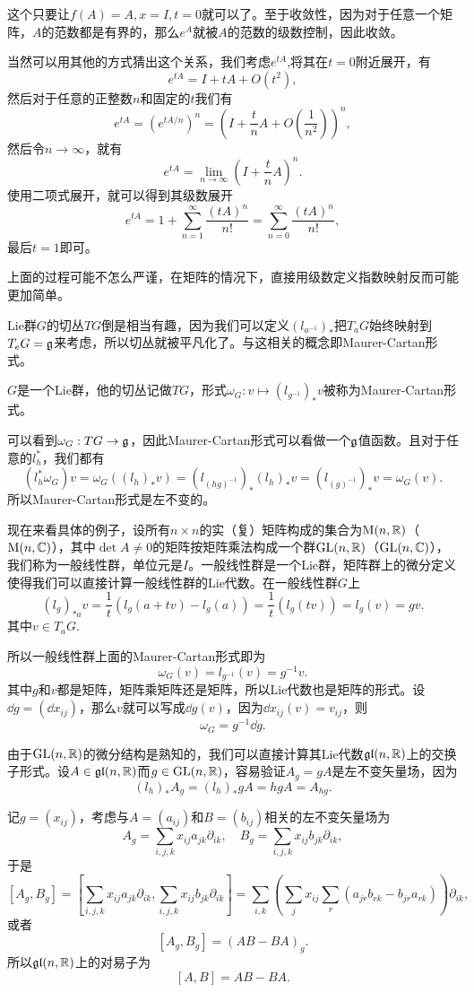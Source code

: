 这个只要让$f(A)=A,x=I,t=0$就可以了。至于收敛性，因为对于任意一个矩阵，$A$的范数都是有界的，那么$e^A$就被$A$的范数的级数控制，因此收敛。

当然可以用其他的方式猜出这个关系，我们考虑$e^{tA}$,将其在$t=0$附近展开，有
\[
e^{tA}=I+tA+O(t^2),
\]
然后对于任意的正整数$n$和固定的$t$我们有
\[
e^{tA}=\left(e^{tA/n}\right)^n=\left(I+\frac{t}{n}A+O\left(\frac{1}{n^2}\right)\right)^n,
\]
然后令$n\to\infty$，就有
\[
e^{tA}=\lim_{n\to\infty}\left(I+\frac{t}{n}A\right)^n.
\]
使用二项式展开，就可以得到其级数展开
\[
	e^{tA}=1+\sum_{n=1}^\infty \frac{(tA)^n}{n!}=\sum_{n=0}^\infty \frac{(tA)^n}{n!},
\]
最后$t=1$即可。

上面的过程可能不怎么严谨，在矩阵的情况下，直接用级数定义指数映射反而可能更加简单。

Lie群$G$的切丛$TG$倒是相当有趣，因为我们可以定义$(l_{a^{-1}})_*$把$T_aG$始终映射到$T_eG={\mathfrak{g}}$来考虑，所以切丛就被平凡化了。与这相关的概念即Maurer-Cartan形式。

\para
$G$是一个Lie群，他的切丛记做$TG$，形式$\omega_G:v\mapsto (l_{g^{-1}})_*v$被称为Maurer-Cartan形式。

可以看到$\omega_G:TG\to {\mathfrak{g}}$，因此Maurer-Cartan形式可以看做一个${\mathfrak{g}}$值函数。且对于任意的$l_h^*$，我们都有
\[
(l_h^*\omega_G)v=\omega_G((l_h)_*v)=(l_{(hg)^{-1}})_*(l_h)_*v=(l_{(g)^{-1}})_*v=\omega_G(v).
\]
所以Maurer-Cartan形式是左不变的。

现在来看具体的例子，设所有$n\times n$的实（复）矩阵构成的集合为$\mathrm{M}(n,\mathbb{R})$（$\mathrm{M}(n,\mathbb{C})$），其中$\det A\neq 0$的矩阵按矩阵乘法构成一个群$\mathrm{GL}(n,\mathbb{R})$（$\mathrm{GL}(n,\mathbb{C})$），我们称为一般线性群，单位元是$I$。一般线性群是一个Lie群，矩阵群上的微分定义使得我们可以直接计算一般线性群的Lie代数。在一般线性群$G$上
\[
	(l_g)_{*a}v=\frac{1}{t}(l_g(a+tv)-l_g(a))
	=\frac{1}{t}(l_g(tv))=l_g(v)=gv.
\]
其中$v\in T_aG$.

所以一般线性群上面的Maurer-Cartan形式即为
\[
	\omega_G(v)=l_{g^{-1}}(v)=g^{-1}v.
\]
其中$g$和$v$都是矩阵，矩阵乘矩阵还是矩阵，所以Lie代数也是矩阵的形式。设$\dd g=(\dd x_{ij})$，那么$v$就可以写成$\dd g(v)$，因为$\dd x_{ij}(v)=v_{ij}$，则
\[
	\omega_G=g^{-1}\dd g.
\]

由于$\mathrm{GL}(n,\mathbb{R})$的微分结构是熟知的，我们可以直接计算其Lie代数$\mathfrak{gl}(n,\mathbb{R})$上的交换子形式。设$A\in\mathfrak{gl}(n,\mathbb{R})$而$g\in\mathrm{GL}(n,\mathbb{R})$，容易验证$A_g=gA$是左不变矢量场，因为
\[
	(l_h)_{*}A_g=(l_h)_{*}gA=hgA=A_{hg}.
\]

记$g=(x_{ij})$，考虑与$A=(a_{ij})$和$B=(b_{ij})$相关的左不变矢量场为
\[
A_g=\sum_{i,j,k}x_{ij}a_{jk}\partial_{ik},\quad B_g=\sum_{i,j,k}x_{ij}b_{jk}\partial_{ik},
\]
于是
\[
[A_g,B_g]=\left[\sum_{i,j,k}x_{ij}a_{jk}\partial_{ik},\sum_{i,j,k}x_{ij}b_{jk}\partial_{ik}\right]=\sum_{i,k}\left(\sum_{j}x_{ij}\sum_{r}(a_{jr}b_{rk}-b_{jr}a_{rk})\right)\partial_{ik},
\]
或者
\[
[A_g,B_g]=(AB-BA)_g.
\]
所以$\mathfrak{gl}(n,\mathbb{R})$上的对易子为
\[
[A,B]=AB-BA.
\]


